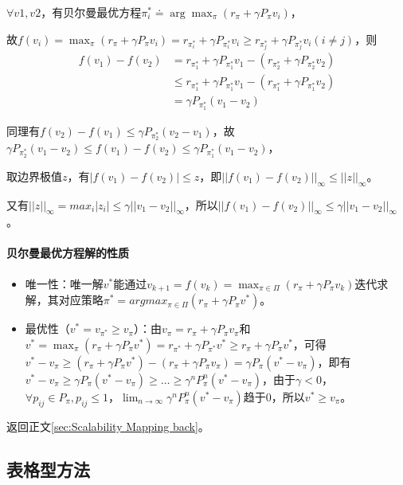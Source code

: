 \documentclass[
12pt, %
a4paper, 
oneside, %
headinclude,footinclude, %
]{scrartcl}
\begin{document}
$ \forall v1,v2 $，有贝尔曼最优方程$ \pi_i^* \doteq \arg \max_{\pi}(r_\pi + \gamma P_\pi v_i) $，

故$ f(v_i) = \max_{\pi}(r_\pi + \gamma P_\pi v_i) = r_{\pi_i^*} + \gamma P_{\pi_i^*} v_i \geq r_{\pi_j^*} + \gamma P_{\pi_j^*} v_i (i \neq j) $，则
\begin{align*}
f(v_1) - f(v_2) 
&= r_{\pi_1^*} + \gamma P_{\pi_1^*} v_1 - (r_{\pi_2^*} + \gamma P_{\pi_2^*} v_2) \\
&\leq r_{\pi_1^*} + \gamma P_{\pi_1^*} v_1 - (r_{\pi_1^*} + \gamma P_{\pi_1^*} v_2) \\
&= \gamma P_{\pi_1^*} (v_1 - v_2)
\end{align*}

同理有$ f(v_2) - f(v_1) \leq \gamma P_{\pi_2^*} (v_2 - v_1) $，故$ \gamma P_{\pi_2^*} (v_1 - v_2)\leq f(v_1) - f(v_2) \leq \gamma P_{\pi_1^*} (v_1 - v_2) $，

取边界极值$ z $，有$ |f(v_1) - f(v_2)| \leq z $，即$ ||f(v_1) - f(v_2)||_\infty \leq ||z||_\infty $。

又有$ ||z||_\infty = max_i |z_i| \leq \gamma ||v_1 - v_2||_\infty $，所以$ ||f(v_1) - f(v_2)||_\infty \leq \gamma ||v_1 - v_2||_\infty $。
\paragraph{贝尔曼最优方程解的性质}
\begin{itemize}
\item 唯一性：唯一解$ v^* $能通过$ v_{k + 1} = f(v_k) = \max_{\pi \in \Pi} (r_\pi + \gamma P_\pi v_k) $迭代求解，其对应策略$ \pi^* = argmax_{\pi \in \Pi}(r_\pi + \gamma P_\pi v^*) $。
\item 最优性（$ v^* = v_{\pi^*} \geq v_{\pi} $）：由$ v_{\pi} = r_{\pi} + \gamma P_{\pi} v_{\pi} $和$ v^* = \max_{\pi}(r_{\pi} + \gamma P_{\pi} v^*) = r_{\pi^*} + \gamma P_{\pi^*} v^* \geq r_{\pi} + \gamma P_{\pi} v^* $，可得$ v^* - v_{\pi} \geq (r_{\pi} + \gamma P_{\pi} v^*) - (r_{\pi} + \gamma P_{\pi} v_{\pi}) = \gamma P_{\pi}(v^* - v_{\pi}) $，即有$ v^* - v_{\pi} \geq \gamma P_{\pi}(v^* - v_{\pi}) \geq \dots \geq \gamma^n P_{\pi}^n(v^* - v_{\pi}) $，由于$ \gamma < 0 $，$ \forall p_{ij} \in P_{\pi}, p_{ij} \leq 1 $，$ \lim_{n \to \infty} \gamma^n P_{\pi}^n(v^* - v_{\pi}) $趋于$ 0 $，所以$ v^* \geq v_{\pi} $。
\end{itemize}

返回正文\ref{sec:Scalability Mapping back}。
\subsection[表格型方法]{表格型方法}
\end{document}
